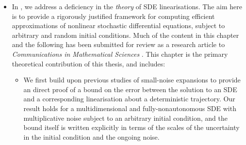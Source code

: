 \begin{itemize}
	\item In , we address a deficiency in the \emph{theory} of SDE linearisations. %
	      The aim here is to provide a rigorously justified framework for computing efficient approximations of nonlinear stochastic differential equations, subject to arbitrary and random initial conditions.
	      Much of the content in this chapter and the following  has been submitted for review as a research article to \emph{Communications in Mathematical Sciences} \citep{BlakeEtAl_2023_ConvergenceStochasticDifferential}.
	      This chapter is the primary theoretical contribution of this thesis, and includes:

	      \begin{itemize}
		      \item We first build upon previous studies of small-noise expansions \cite[e.g.]{Sanz-AlonsoStuart_2017_GaussianApproximationsSmall,Blagoveshchenskii_1962_DiffusionProcessesDepending,FreidlinWentzell_1998_RandomPerturbationsDynamical} to provide an direct proof of a bound on the error between the solution to an SDE and a corresponding linearisation about a deterministic trajectory.
		            Our result holds for a multidimensional and fully-nonautonomous SDE with multiplicative noise subject to an arbitrary initial condition, and the bound itself is written explicitly in terms of the scales of the uncertainty in the initial condition and the ongoing noise.




\end{itemize}
\end{itemize}
